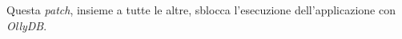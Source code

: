 \documentclass[a4paper, 12pt]{article}
\newcommand{\code}[1]{\colorbox{cverbbg}{\texttt{\StrSubstitute{#1}{_}{\_}}}}
\newcommand{\ollydb}{\emph{OllyDB}}
\newcommand{\key}[1]{\texttt{#1}}
\begin{document}
Questa \textit{patch}, insieme a tutte le altre, sblocca l'esecuzione dell'applicazione con \ollydb{}.\\
\end{document}

